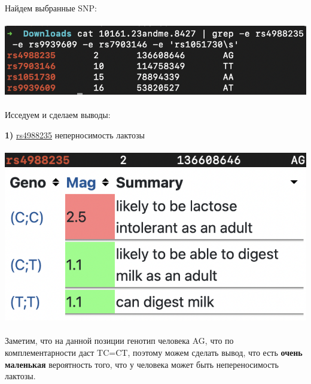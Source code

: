 \documentclass[12pt]{article}
\begin{document}
Найдем выбранные SNP:\\\\
\includegraphics[width=\textwidth]{images/image3.png}\\\\
Исседуем и сделаем выводы:
\newpage

\textbf{1)} \href{https://www.snpedia.com/index.php/Rs4988235}{rs4988235} неперносимость лактозы\\\\
\includegraphics[width=\textwidth]{images/image4.png}\\
\includegraphics[width=\textwidth]{images/rs4988235.png}\\\\
Заметим, что на данной позиции генотип человека AG, что по комплементарности даст TC=CT, поэтому можем сделать вывод, что есть \textbf{очень маленькая} вероятность того, что у человека может быть непереносимость лактозы.
\newpage
\end{document}
